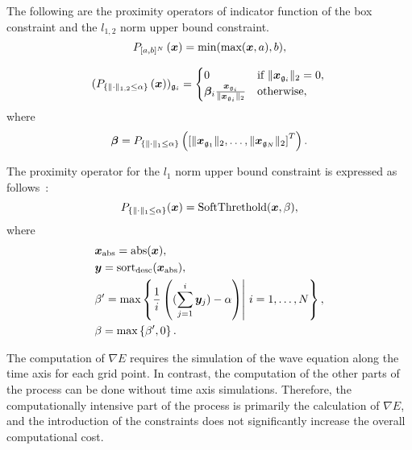 The following are the proximity operators of indicator function of the box constraint and the $l_{1,2}$ norm upper bound constraint.
\begin{equation} \label{eq:ProximityOperatorForBoxConstraint} \projBoxSolution, \end{equation}

\begin{equation} \label{eq:ProximityOperatorForL12Ball} \projLOneTwoBallSolution \end{equation}
where
\begin{equation} \label{eq:ProximityOperatorForL12BallWhere} \projLOneTwoBallSolutionWhere \notag \end{equation}

The proximity operator for the $l_1$ norm upper bound constraint is expressed as follows~\cite{L1-ball-projection}:
\begin{equation} \label{eq:ProximityOperatorForL1Ball}  \projLOneBallSolution, \end{equation}
where
\begin{equation} \label{eq:ProximityOperatorForL1BallWhere} \projLOneBallSolutionWhere \notag \end{equation}

The computation of $\nabla E$ requires the simulation of the wave equation along the time axis for each grid point.
In contrast, the computation of the other parts of the process can be done without time axis simulations.
Therefore, the computationally intensive part of the process is primarily the calculation of $\nabla E$, and the introduction of the constraints does not significantly increase the overall computational cost.
